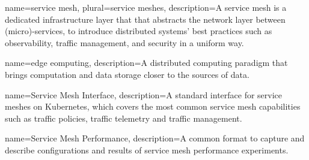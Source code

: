 




\makeglossaries












{
    name={service mesh},
    plural={service meshes},
    description={A service mesh is a dedicated infrastructure layer that that abstracts the network layer between (micro)-services, to introduce distributed systems' best practices such as observability, traffic management, and security in a uniform way.}
}

{
    name={edge eomputing},
    description={A distributed computing paradigm that brings computation and data storage closer to the sources of data.}
}

{
    name={Service Mesh Interface},
    description={A standard interface for service meshes on Kubernetes, which covers the most common service mesh capabilities such as traffic policies, traffic telemetry and traffic management.}
}

{
    name={Service Mesh Performance},
    description={A common format to capture and describe configurations and results of service mesh performance experiments.}
}

